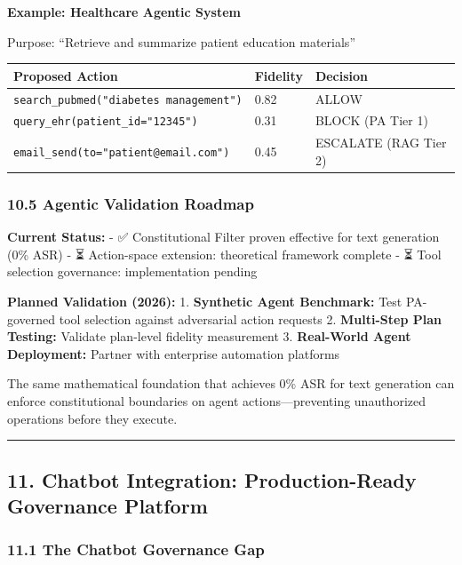 \textbf{Example: Healthcare Agentic System}

Purpose: ``Retrieve and summarize patient education materials''

{\def\LTcaptype{none} %
\begin{longtable}[]{@{}lll@{}}
\toprule\noalign{}
Proposed Action & Fidelity & Decision \\
\midrule\noalign{}
\endhead
\bottomrule\noalign{}
\endlastfoot
\texttt{search\_pubmed("diabetes\ management")} & 0.82 & ALLOW \\
\texttt{query\_ehr(patient\_id="12345")} & 0.31 & BLOCK (PA Tier 1) \\
\texttt{email\_send(to="patient@email.com")} & 0.45 & ESCALATE (RAG Tier
2) \\
\end{longtable}
}

\subsubsection{10.5 Agentic Validation
Roadmap}\label{agentic-validation-roadmap}

\textbf{Current Status:} - ✅ Constitutional Filter proven effective for
text generation (0\% ASR) - ⏳ Action-space extension: theoretical
framework complete - ⏳ Tool selection governance: implementation
pending

\textbf{Planned Validation (2026):} 1. \textbf{Synthetic Agent
Benchmark:} Test PA-governed tool selection against adversarial action
requests 2. \textbf{Multi-Step Plan Testing:} Validate plan-level
fidelity measurement 3. \textbf{Real-World Agent Deployment:} Partner
with enterprise automation platforms

The same mathematical foundation that achieves 0\% ASR for text
generation can enforce constitutional boundaries on agent
actions---preventing unauthorized operations before they execute.

\begin{center}\rule{0.5\linewidth}{0.5pt}\end{center}

\subsection{11. Chatbot Integration: Production-Ready Governance
Platform}\label{chatbot-integration-production-ready-governance-platform}

\subsubsection{11.1 The Chatbot Governance
Gap}\label{the-chatbot-governance-gap}

